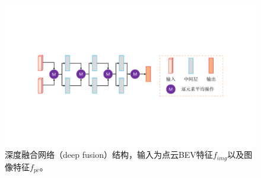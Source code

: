 \begin{figure}[t]
	\centering
	\includegraphics[trim={4cm, 6cm, 4cm, 6cm}, clip, width=\textwidth]{imgs/fusion-network.pdf}
	\caption{深度融合网络（deep fusion）结构，输入为点云BEV特征$f_{img}$以及图像特征$f_{pc}$。}
	\label{fig:fusion_network}
\end{figure}
